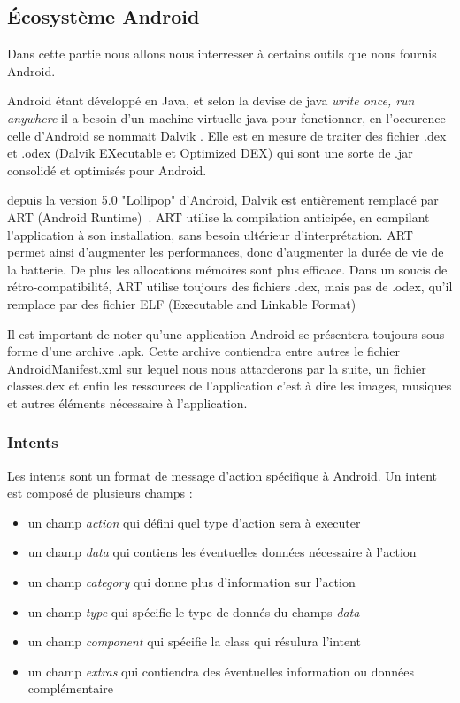 \documentclass[12pt]{article}
\begin{document}
\subsection{Écosystème Android}
Dans cette partie nous allons nous interresser à certains outils que nous fournis Android.

Android étant développé en Java, et selon la devise de java \textit{\og write once, run anywhere\fg{}} il a besoin d'un machine virtuelle java pour fonctionner, en l'occurence celle d'Android se  nommait \og Dalvik \fg{}. Elle est en mesure de traiter des fichier .dex et .odex (Dalvik EXecutable et Optimized DEX) qui sont une sorte de .jar consolidé et optimisés pour Android.

depuis la version 5.0 "Lollipop" d'Android, Dalvik est entièrement remplacé par ART (Android Runtime)~\cite{ART}. ART utilise la compilation anticipée, en compilant l'application à son installation, sans besoin ultérieur d'interprétation. ART permet ainsi d'augmenter les performances, donc d'augmenter la durée de vie de la batterie. De plus les allocations mémoires sont plus efficace. Dans un soucis de rétro-compatibilité, ART utilise toujours des fichiers .dex, mais pas de .odex, qu'il remplace par des fichier ELF (Executable and Linkable Format)

Il est important de noter qu'une application Android se présentera toujours sous forme d'une archive .apk. Cette archive contiendra entre autres le fichier AndroidManifest.xml sur lequel nous nous attarderons par la suite, un fichier classes.dex et enfin les ressources de l'application c'est à dire les images, musiques et autres éléments nécessaire à l'application.

\subsubsection{Intents}
Les intents sont un format de message d'action spécifique à Android. Un intent est composé de plusieurs champs : 
\begin{itemize}
\item un champ \textit{action} qui défini quel type d'action sera à executer
\item un champ \textit{data} qui contiens les éventuelles données nécessaire à l'action
\item un champ \textit{category} qui donne plus d'information sur l'action
\item un champ \textit{type} qui spécifie le type de donnés du champs \textit{data}
\item un champ \textit{component} qui spécifie la class qui résulura l'intent
\item un champ \textit{extras} qui contiendra des éventuelles information ou données complémentaire
\end{itemize}
\end{document}
